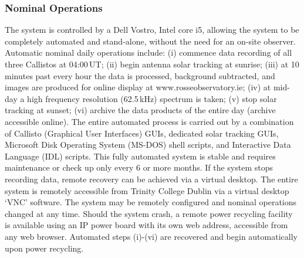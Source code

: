 \subsubsection{Nominal Operations}

The system is controlled by a Dell Vostro, Intel core i5, allowing the system to be completely automated and stand-alone, without the need for an on-site observer. Automatic nominal daily operations include: (i) commence data recording of all three Callistos at 04:00\,UT; (ii) begin antenna solar tracking at sunrise; (iii) at 10 minutes past every hour the data is processed, background subtracted, and images are produced for online display at www.rosseobservatory.ie; (iv) at mid-day a high frequency resolution (62.5\,kHz) spectrum is taken; (v) stop solar tracking at sunset; (vi) archive the data products of the entire day (archive accessible online). The entire automated process is carried out by a combination of Callisto (Graphical User Interfaces) GUIs, dedicated solar tracking GUIs, Microsoft Disk Operating System (MS-DOS) shell scripts, and Interactive Data Language (IDL) scripts. This fully automated system is stable and requires maintenance or check up only every 6 or more months. If the system stops recording data, remote recovery can be achieved via a virtual desktop. The entire system is remotely accessible from Trinity College Dublin via a virtual desktop `VNC' software. The system may be remotely configured and nominal operations changed at any time. Should the system crash, a remote power recycling facility is available using an IP power board with its own web address, accessible from any web browser. Automated steps (i)-(vi) are recovered and begin automatically upon power recycling.


